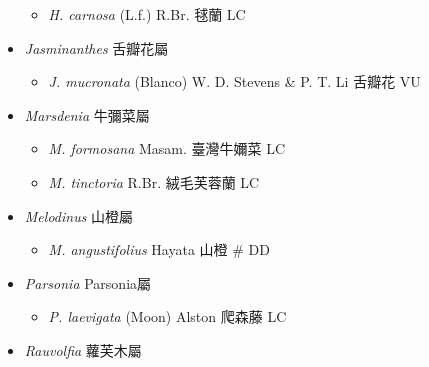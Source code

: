 \begin{itemize}
  \begin{itemize}
        \item[] \textit{H. carnosa} (L.f.) R.Br.  毬蘭   LC
  \end{itemize}
 \item[] \textit{Jasminanthes} 舌瓣花屬
                                
  \begin{itemize}
        \item[] \textit{J. mucronata} (Blanco) W. D. Stevens \& P. T. Li  舌瓣花   VU
  \end{itemize}
 \item[] \textit{Marsdenia} 牛彌菜屬
                                
  \begin{itemize}
        \item[] \textit{M. formosana} Masam.  臺灣牛嬭菜   LC
        \item[] \textit{M. tinctoria} R.Br.  絨毛芙蓉蘭   LC
  \end{itemize}
 \item[] \textit{Melodinus} 山橙屬
                                
  \begin{itemize}
        \item[] \textit{M. angustifolius} Hayata  山橙  \# DD
  \end{itemize}
 \item[] \textit{Parsonia} Parsonia屬
                                
  \begin{itemize}
        \item[] \textit{P. laevigata} (Moon) Alston  爬森藤   LC
  \end{itemize}
 \item[] \textit{Rauvolfia} 蘿芙木屬
                                

\end{itemize}
